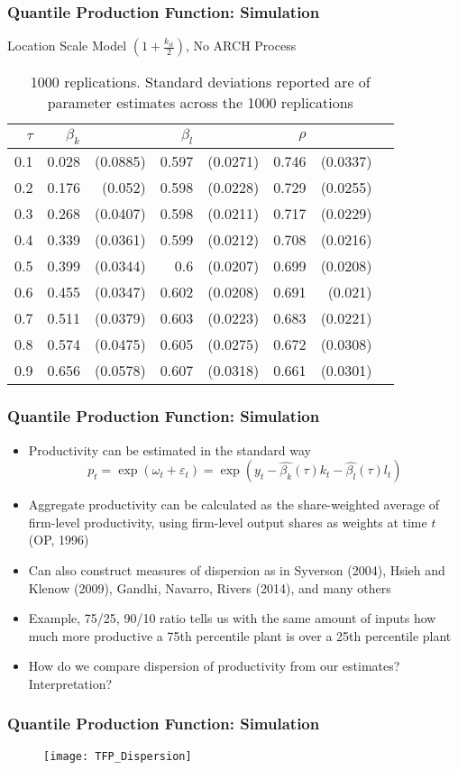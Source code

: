 \documentclass{beamer}
\begin{document}
\begin{frame}
\frametitle{Quantile Production Function: Simulation}
\begin{table}[ht]
\centering
\caption{Location Scale Model $(1+\frac{k_{it}}{2})$, No ARCH Process}
\begin{tabular}{rrrrrrrr}
  \hline
$\tau$ & $\beta_{k}$ &  & $\beta_{l}$ &  & $\rho$ &  \\ 
  \hline
0.1 & 0.028 & (0.0885) & 0.597 & (0.0271) & 0.746 & (0.0337) \\ 
0.2 & 0.176 & (0.052) & 0.598 & (0.0228) & 0.729 & (0.0255) \\ 
0.3 & 0.268 & (0.0407) & 0.598 & (0.0211) & 0.717 & (0.0229) \\ 
0.4 & 0.339 & (0.0361) & 0.599 & (0.0212) & 0.708 & (0.0216) \\ 
0.5 & 0.399 & (0.0344) & 0.6 & (0.0207) & 0.699 & (0.0208) \\ 
0.6 & 0.455 & (0.0347) & 0.602 & (0.0208) & 0.691 & (0.021) \\ 
0.7 & 0.511 & (0.0379) & 0.603 & (0.0223) & 0.683 & (0.0221) \\
0.8 & 0.574 & (0.0475) & 0.605 & (0.0275) & 0.672 & (0.0308) \\
0.9 & 0.656 & (0.0578) & 0.607 & (0.0318) & 0.661 & (0.0301) \\ 
   \hline
\end{tabular}
\caption{1000 replications. Standard deviations reported are of parameter estimates across the 1000 replications}
\end{table}

\end{frame}


\begin{frame}
\frametitle{Quantile Production Function: Simulation}
\begin{itemize}
	\item Productivity can be estimated in the standard way
	\begin{equation}
	p_{t}=\exp(\omega_{t}+\varepsilon_{t})=\exp(y_{t}-\hat{\beta_{k}}(\tau)k_{t}-\hat{\beta_{l}}(\tau)l_{t})
	\end{equation}
	\item Aggregate productivity can be calculated as the share-weighted average of firm-level productivity, using firm-level output shares as weights at time $t$ (OP, 1996)
	\item Can also construct measures of dispersion as in Syverson (2004), Hsieh and Klenow (2009), Gandhi, Navarro, Rivers (2014), and many others
	\item Example, 75/25, 90/10 ratio tells us with the same amount of inputs how much more productive a 75th percentile plant is over a 25th percentile plant
	\item How do we compare dispersion of productivity from our estimates? Interpretation?
\end{itemize}
\end{frame}


\begin{frame}
\frametitle{Quantile Production Function: Simulation}
\begin{figure}[H]
\centering
\texttt{[image: TFP\_Dispersion]}
\end{figure}
	
\end{frame}
\end{document}
